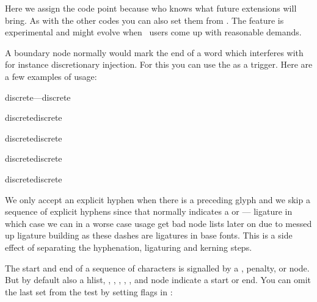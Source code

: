 \typebuffer

Here we assign the code point because who knows what future extensions will
bring. As with the other codes you can also set them from \LUA. The feature is
experimental and might evolve when \CONTEXT\ users come up with reasonable
demands.

\startpacked \getbuffer \stoppacked

A boundary node normally would mark the end of a word which interferes with for
instance discretionary injection. For this you can use the \type {\wordboundary}
as a trigger. Here are a few examples of usage:

\startbuffer
discrete---discrete
\stopbuffer
\typebuffer \startnarrower \dontcomplain \hsize 1pt \getbuffer \par \stopnarrower
\startbuffer
discrete\discretionary{}{}{---}discrete
\stopbuffer
\typebuffer \startnarrower \dontcomplain \hsize 1pt \getbuffer \par \stopnarrower
\startbuffer
discrete\wordboundary\discretionary{}{}{---}discrete
\stopbuffer
\typebuffer \startnarrower \dontcomplain \hsize 1pt \getbuffer \par \stopnarrower
\startbuffer
discrete\wordboundary\discretionary{}{}{---}\wordboundary discrete
\stopbuffer
\typebuffer \startnarrower \dontcomplain \hsize 1pt \getbuffer \par \stopnarrower
\startbuffer
discrete\wordboundary\discretionary{---}{}{}\wordboundary discrete
\stopbuffer
\typebuffer \startnarrower \dontcomplain \hsize 1pt \getbuffer \par \stopnarrower

We only accept an explicit hyphen when there is a preceding glyph and we skip a
sequence of explicit hyphens since that normally indicates a \type {--} or \type
{---} ligature in which case we can in a worse case usage get bad node lists
later on due to messed up ligature building as these dashes are ligatures in base
fonts. This is a side effect of separating the hyphenation, ligaturing and
kerning steps.

The start and end of a sequence of characters is signalled by a , \type
{penalty},  or  node. But by default also a \type
{hlist}, , , , , , and
 node indicate a start or end. You can omit the last set from the
test by setting flags in \type {\hyphenationmode}:

\startcolumns[n=2]
\stopcolumns

